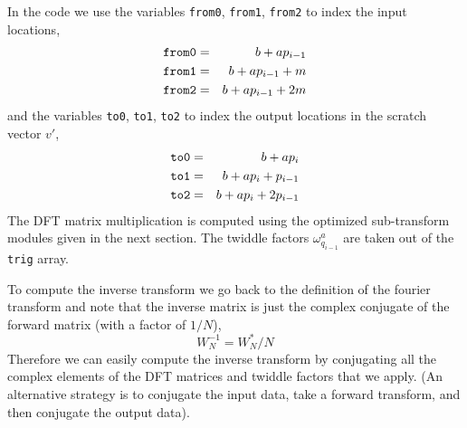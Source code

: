 \documentclass[fleqn,12pt]{article}
\newenvironment{algorithm}{\begin{quote} %
\begin{algorithmic}\samepage}{\end{algorithmic} %
\end{quote}}
\begin{document}
\begin{algorithm}
\ENDFOR
\ENDFOR
\end{algorithm}
%
In the code we use the variables {\tt from0}, {\tt from1}, {\tt from2}
to index the input locations,
%
\begin{eqnarray}
\mbox{\tt from0} &=& b + a p_{i-1} \\
\mbox{\tt from1} &=& b + a p_{i-1} + m \\
\mbox{\tt from2} &=& b + a p_{i-1} + 2m
\end{eqnarray}
%
and the variables {\tt to0}, {\tt to1}, {\tt to2} to index the output
locations in the scratch vector $v'$,
%
\begin{eqnarray}
\mbox{\tt to0} &=& b + a p_{i} \\
\mbox{\tt to1} &=& b + a p_{i} + p_{i-1} \\
\mbox{\tt to2} &=& b + a p_{i} + 2 p_{i-1}
\end{eqnarray}
%
The DFT matrix multiplication is computed using the optimized
sub-transform modules given in the next section. The twiddle factors
$\omega^a_{q_{i-1}}$ are taken out of the {\tt trig} array.

To compute the inverse transform we go back to the definition of the
fourier transform and note that the inverse matrix is just the complex
conjugate of the forward matrix (with a factor of $1/N$),
%
\begin{equation}
W^{-1}_N = W^*_N / N 
\end{equation}
%
Therefore we can easily compute the inverse transform by conjugating
all the complex elements of the DFT matrices and twiddle factors that
we apply. (An alternative strategy is to conjugate the input data,
take a forward transform, and then conjugate the output data).
\end{document}
